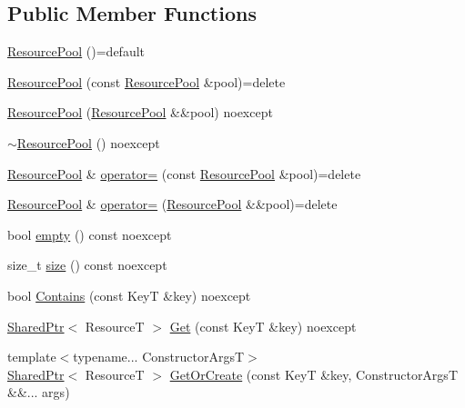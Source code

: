 \subsection*{Public Member Functions}
\begin{DoxyCompactItemize}
\item 
\mbox{\hyperlink{classmage_1_1_resource_pool_a94aff142869744ed48fb1b426face48b}{Resource\+Pool}} ()=default
\item 
\mbox{\hyperlink{classmage_1_1_resource_pool_ad1cc0cf98317e65900879b85625f10ac}{Resource\+Pool}} (const \mbox{\hyperlink{classmage_1_1_resource_pool}{Resource\+Pool}} \&pool)=delete
\item 
\mbox{\hyperlink{classmage_1_1_resource_pool_add752b5c5f2244cbc8f24ee0755dafcb}{Resource\+Pool}} (\mbox{\hyperlink{classmage_1_1_resource_pool}{Resource\+Pool}} \&\&pool) noexcept
\item 
\mbox{\hyperlink{classmage_1_1_resource_pool_ad5dceb2a1cbd47ced5cb6ad269f4510e}{$\sim$\+Resource\+Pool}} () noexcept
\item 
\mbox{\hyperlink{classmage_1_1_resource_pool}{Resource\+Pool}} \& \mbox{\hyperlink{classmage_1_1_resource_pool_accb458f018c38fc154fd3931e0129ad6}{operator=}} (const \mbox{\hyperlink{classmage_1_1_resource_pool}{Resource\+Pool}} \&pool)=delete
\item 
\mbox{\hyperlink{classmage_1_1_resource_pool}{Resource\+Pool}} \& \mbox{\hyperlink{classmage_1_1_resource_pool_a75dbf08b971929eb90d32b38faa3cfb1}{operator=}} (\mbox{\hyperlink{classmage_1_1_resource_pool}{Resource\+Pool}} \&\&pool)=delete
\item 
bool \mbox{\hyperlink{classmage_1_1_resource_pool_aa406e4382ec7047c5576d039d7adc424}{empty}} () const noexcept
\item 
size\+\_\+t \mbox{\hyperlink{classmage_1_1_resource_pool_ab032684a1ed5a782a61f663e269a994a}{size}} () const noexcept
\item 
bool \mbox{\hyperlink{classmage_1_1_resource_pool_a36665c107134816d3e72322e9c80bebd}{Contains}} (const KeyT \&key) noexcept
\item 
\mbox{\hyperlink{namespacemage_a1e01ae66713838a7a67d30e44c67703e}{Shared\+Ptr}}$<$ ResourceT $>$ \mbox{\hyperlink{classmage_1_1_resource_pool_abdd0bc69948404b0185ef7c417e95ff9}{Get}} (const KeyT \&key) noexcept
\item 
{\footnotesize template$<$typename... Constructor\+ArgsT$>$ }\\\mbox{\hyperlink{namespacemage_a1e01ae66713838a7a67d30e44c67703e}{Shared\+Ptr}}$<$ ResourceT $>$ \mbox{\hyperlink{classmage_1_1_resource_pool_ab66c25c99198874eeae3ea54a5942c75}{Get\+Or\+Create}} (const KeyT \&key, Constructor\+ArgsT \&\&... args)

\end{DoxyCompactItemize}
